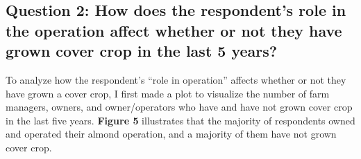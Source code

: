 \documentclass[12pt,]{article}
\newenvironment{Shaded}{\begin{snugshade}}{\end{snugshade}}
\newcommand{\StringTok}[1]{\textcolor[rgb]{0.31,0.60,0.02}{#1}}
\newcommand{\OperatorTok}[1]{\textcolor[rgb]{0.81,0.36,0.00}{\textbf{#1}}}
\newcommand{\NormalTok}[1]{#1}
\begin{document}
\subsection{Question 2: How does the respondent's role in the operation
affect whether or not they have grown cover crop in the last 5
years?}\label{question-2-how-does-the-respondents-role-in-the-operation-affect-whether-or-not-they-have-grown-cover-crop-in-the-last-5-years}

To analyze how the respondent's ``role in operation'' affects whether or
not they have grown a cover crop, I first made a plot to visualize the
number of farm managers, owners, and owner/operators who have and have
not grown cover crop in the last five years. \textbf{Figure 5}
illustrates that the majority of respondents owned and operated their
almond operation, and a majority of them have not grown cover crop.

\begin{Shaded}
\end{Shaded}

\FloatBarrier

  \providecommand{\huxb}[2]{\arrayrulecolor[RGB]{#1}\global\arrayrulewidth=#2pt}
  \providecommand{\huxvb}[2]{\color[RGB]{#1}\vrule width #2pt}
  \providecommand{\huxtpad}[1]{\rule{0pt}{\baselineskip+#1}}
  \providecommand{\huxbpad}[1]{\rule[-#1]{0pt}{#1}}
\end{document}
